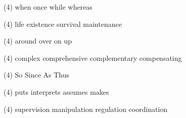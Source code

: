 \item
\begin{tasks}(4)
	\task when
	\task once
	\task while
	\task whereas
\end{tasks}
\item
\begin{tasks}(4)
	\task life
	\task existence
	\task survival
	\task maintenance
\end{tasks}
\item
\begin{tasks}(4)
	\task around
	\task over
	\task on
	\task up
\end{tasks}
\item
\begin{tasks}(4)
	\task complex
	\task comprehensive
	\task complementary
	\task compensating
\end{tasks}
\item
\begin{tasks}(4)
	\task So
	\task Since
	\task As
	\task Thus
\end{tasks}
\item
\begin{tasks}(4)
	\task puts
	\task interprets
	\task assumes
	\task makes
\end{tasks}
\item
\begin{tasks}(4)
	\task supervision
	\task manipulation
	\task regulation
	\task coordination
\end{tasks}